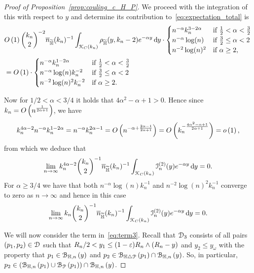 \begin{proof}[Proof of Proposition~\ref{prop:couling_c_H_P}]
We proceed with the integration of this with respect to $y$ and determine its contribution to~\eqref{eq:expectation_total} is 
\begin{align*}
	&O\left(1\right) \binom{k_n}{2}^{-2} \overline{n}_{\widetilde{\mathbb{H}}}(k_n)^{-1} \int_{{\mathcal K}_{C}(k_n)} \rho_{\widetilde{\mathbb{H}}}(y,k_n-2) e^{-\alpha y} \operatorname{\mathrm{d}\hspace{-2pt}} y
	\cdot 
	\begin{cases}
			n^{-\alpha} k_n^{3 - 2\alpha} &\mbox{if } \frac{1}{2} < \alpha < \frac{3}{2}\\
			n^{-\alpha} \log(n) &\mbox{if } \frac{3}{2} \le \alpha < 2\\
			n^{-2} \log(n)^{2} &\mbox{if } \alpha \ge 2,
	\end{cases}\\
	&= O\left(1\right) \cdot \begin{cases}
				n^{-\alpha} k_n^{1 - 2\alpha} &\mbox{if } \frac{1}{2} < \alpha < \frac{3}{2}\\
				n^{-\alpha} \log(n) k_n^{-2} &\mbox{if } \frac{3}{2} \le \alpha < 2\\
				n^{-2} \log(n)^{2} k_n^{-2} &\mbox{if } \alpha \ge 2.
		\end{cases}
\end{align*}

Now for $1/2 < \alpha < 3/4$ it holds that $4\alpha^2 - \alpha + 1 > 0$. Hence since $k_n = O\left(n^{\frac{1}{2\alpha + 1}}\right)$, we have
\[
	k_n^{4\alpha - 2} n^{-\alpha} k_n^{1 - 2\alpha} = n^{-\alpha} k_n^{2\alpha - 1} = O\left(n^{-\alpha + \frac{2\alpha - 1}{2\alpha + 1}}\right) = O\left(k_n^{-\frac{4\alpha^2 - \alpha + 1}{2\alpha + 1}}\right) = o\left(1\right),
\]
from which we deduce that
\[
	\lim_{n \to \infty} k_n^{4\alpha -2} \binom{k_n}{2}^{-1} \overline{n}_{\widetilde{\mathbb{H}}}(k_n)^{-1} \int_{{\mathcal K}_{C}(k_n)} \mathcal{I}_n^{(2)}(y)
	e^{-\alpha y} \operatorname{\mathrm{d}\hspace{-2pt}} y = 0.
\]
For $\alpha \ge 3/4$ we have that both $n^{-\alpha} \log(n) k_n^{-1}$ and $n^{-2} \log(n)^2 k_n^{-1}$ converge to zero as $n \to \infty$ and hence in this case
\[
	\lim_{n \to \infty} k_n \binom{k_n}{2}^{-1} \overline{n}_{\widetilde{\mathbb{H}}}(k_n)^{-1} \int_{{\mathcal K}_{C}(k_n)} \mathcal{I}_n^{(2)}(y)
	e^{-\alpha y} \operatorname{\mathrm{d}\hspace{-2pt}} y = 0.
\]

We will now consider the term in~\eqref{eq:term3}. 
Recall that $\mathcal{D}_{3}$ consists of all pairs $(p_1, p_2 ) \in \mathcal{D}_{}$ such that $R_n/2 < y_1 \leq (1-\varepsilon)R_n \wedge (R_n-y)$ and $y_2 \leq y_\omega$ with the property that 
$p_1 \in {\mathcal B}_{\mathbb{H},n}\left(y\right)$ and $p_2 \in {\mathcal B}_{\mathbb{H} \bigtriangleup {\mathcal P}}\left(p_1\right) \cap {\mathcal B}_{\mathbb{H},n}\left(y\right)$.    
So, in particular, $p_2 \in ({\mathcal B}_{\mathbb{H},n}\left(p_1\right) \cup {\mathcal B}_{{\mathcal P}}\left(p_1\right)) \cap {\mathcal B}_{\mathbb{H},n}\left(y\right)$.


\end{proof}
